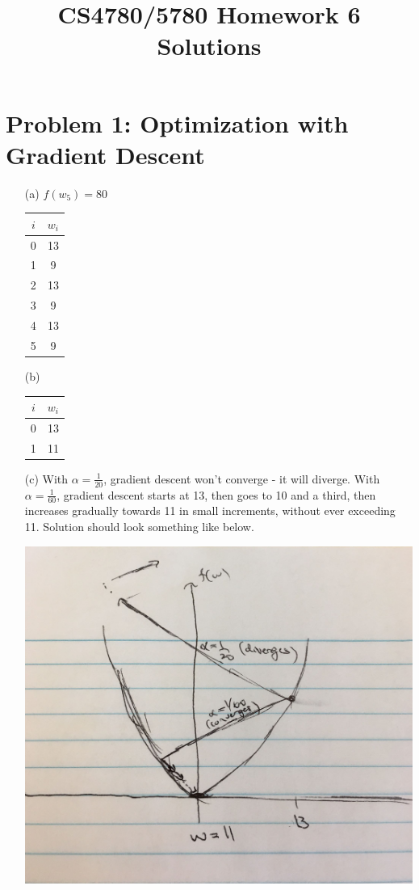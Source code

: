 \documentclass[11pt]{article}
\title{CS4780/5780 Homework 6 Solutions}
\begin{document}
	\maketitle
	\section*{Problem 1: Optimization with Gradient Descent}
	\begin{enumerate}[(1)]
		\item[(a)] $f(w_5) = 80$
		\begin{center}
			\begin{tabular}{|c|c|}
				\hline
				$i$ & $w_i$ \\
				\hline
				0 & 13 \\
				1 & 9 \\
				2 & 13 \\
				3 & 9 \\
				4 & 13 \\
				5 & 9 \\
				\hline
			\end{tabular}
		\end{center}
		\item[(b)] $~$
		\begin{center}
			\begin{tabular}{|c|c|}
				\hline
				$i$ & $w_i$ \\
				\hline
				0 & 13 \\
				1 & 11 \\
				\hline
			\end{tabular}
		\end{center}
		\item[(c)] With $\alpha = \frac{1}{20}$, gradient descent won't converge - it will diverge. With $\alpha = \frac{1}{60}$, gradient descent starts at 13, then goes to 10 and a third, then increases gradually towards 11 in small increments, without ever exceeding 11. Solution should look something like below.
		\begin{center}
			\includegraphics[scale=0.2]{1c}
		\end{center}
	\end{enumerate}
\end{document}

